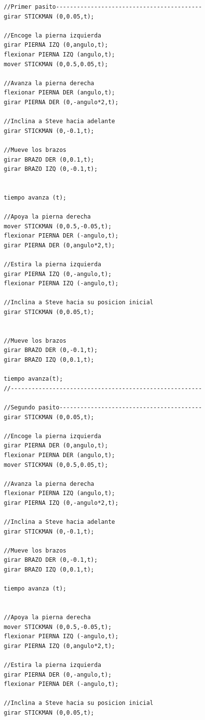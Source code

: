 \documentclass[a4paper, 12pt]{book}
\begin{document}
\begin{itemize}
\begin{verbatim}
    //Primer pasito------------------------------------------
    girar STICKMAN (0,0.05,t);
    
    //Encoge la pierna izquierda
    girar PIERNA IZQ (0,angulo,t);
    flexionar PIERNA IZQ (angulo,t);
    mover STICKMAN (0,0.5,0.05,t);

    //Avanza la pierna derecha
    flexionar PIERNA DER (angulo,t);
    girar PIERNA DER (0,-angulo*2,t);

    //Inclina a Steve hacia adelante
    girar STICKMAN (0,-0.1,t);

    //Mueve los brazos
    girar BRAZO DER (0,0.1,t);
    girar BRAZO IZQ (0,-0.1,t);


    tiempo avanza (t);

    //Apoya la pierna derecha
    mover STICKMAN (0,0.5,-0.05,t);
    flexionar PIERNA DER (-angulo,t);
    girar PIERNA DER (0,angulo*2,t);

    //Estira la pierna izquierda
    girar PIERNA IZQ (0,-angulo,t);
    flexionar PIERNA IZQ (-angulo,t);

    //Inclina a Steve hacia su posicion inicial
    girar STICKMAN (0,0.05,t);

    
    //Mueve los brazos
    girar BRAZO DER (0,-0.1,t);
    girar BRAZO IZQ (0,0.1,t);
    
    tiempo avanza(t);
    //-------------------------------------------------------

    //Segundo pasito-----------------------------------------
    girar STICKMAN (0,0.05,t);
    
    //Encoge la pierna izquierda
    girar PIERNA DER (0,angulo,t);
    flexionar PIERNA DER (angulo,t);
    mover STICKMAN (0,0.5,0.05,t);

    //Avanza la pierna derecha
    flexionar PIERNA IZQ (angulo,t);
    girar PIERNA IZQ (0,-angulo*2,t);

    //Inclina a Steve hacia adelante
    girar STICKMAN (0,-0.1,t);

    //Mueve los brazos
    girar BRAZO DER (0,-0.1,t);
    girar BRAZO IZQ (0,0.1,t);

    tiempo avanza (t);


    //Apoya la pierna derecha
    mover STICKMAN (0,0.5,-0.05,t);
    flexionar PIERNA IZQ (-angulo,t);
    girar PIERNA IZQ (0,angulo*2,t);

    //Estira la pierna izquierda
    girar PIERNA DER (0,-angulo,t);
    flexionar PIERNA DER (-angulo,t);

    //Inclina a Steve hacia su posicion inicial
    girar STICKMAN (0,0.05,t);
    

\end{verbatim}
\end{itemize}
\end{document}
